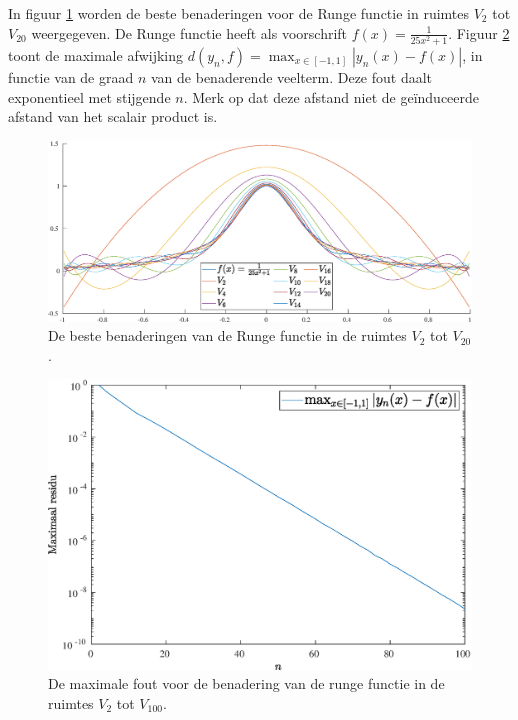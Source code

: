 \documentclass[a4paper, 12pt, titlepage, fleqn]{article}
\begin{document}
In figuur \ref{fig:rungeFunctie} worden de beste benaderingen voor de Runge functie in ruimtes $V_2$ tot $V_{20}$ weergegeven. De Runge functie heeft als voorschrift $f(x) = \frac{1}{25x^2+1}$. Figuur \ref{fig:rungeFoutBenadering} toont de maximale afwijking $d(y_n,f) = \max_{x \in [-1,1]}|y_n(x)-f(x)|$, in functie van de graad $n$ van de benaderende veelterm.  Deze fout daalt exponentieel met stijgende $n$. Merk op dat deze afstand niet de ge\"induceerde afstand van het scalair product is.
\begin{figure}[h]
\centering
\includegraphics[scale=0.4]{../Afbeeldingen/rungeBenadering.eps}
\caption{De beste benaderingen van de Runge functie in de ruimtes $V_2$ tot $V_{20}$.
\label{fig:rungeFunctie}}
\end{figure}

\begin{figure}
\centering
\includegraphics[scale=0.4]{../Afbeeldingen/rungeFout.eps}
\caption{De maximale fout voor de benadering van de runge functie in de ruimtes $V_2$ tot $V_{100}$.
\label{fig:rungeFoutBenadering}}
\end{figure}
\end{document}
